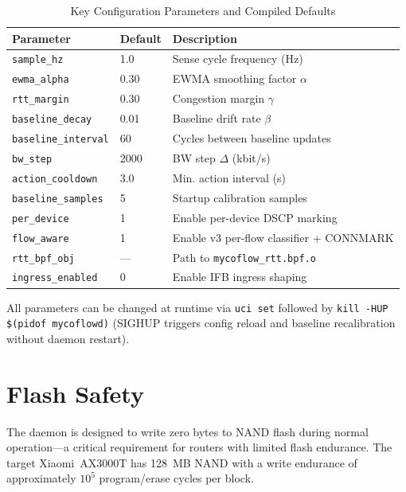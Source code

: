 \begin{table}[h]
\caption{Key Configuration Parameters and Compiled Defaults}
\label{tab:cfg}
\centering
\small
{\setlength{\tabcolsep}{4pt}
\begin{tabular}{p{4cm}p{1.2cm}p{7cm}}
\toprule
\textbf{Parameter} & \textbf{Default} & \textbf{Description} \\
\midrule
\texttt{sample\_hz}         & 1.0  & Sense cycle frequency (Hz) \\
\texttt{ewma\_alpha}        & 0.30 & EWMA smoothing factor $\alpha$ \\
\texttt{rtt\_margin}        & 0.30 & Congestion margin $\gamma$ \\
\texttt{baseline\_decay}    & 0.01 & Baseline drift rate $\beta$ \\
\texttt{baseline\_interval} & 60   & Cycles between baseline updates \\
\texttt{bw\_step}           & 2000 & BW step $\Delta$ (kbit/s) \\
\texttt{action\_cooldown}   & 3.0  & Min. action interval (s) \\
\texttt{baseline\_samples}  & 5    & Startup calibration samples \\
\texttt{per\_device}        & 1    & Enable per-device DSCP marking \\
\texttt{flow\_aware}        & 1    & Enable v3 per-flow classifier + CONNMARK \\
\texttt{rtt\_bpf\_obj}      & ---  & Path to \texttt{mycoflow\_rtt.bpf.o} \\
\texttt{ingress\_enabled}   & 0    & Enable IFB ingress shaping \\
\bottomrule
\end{tabular}}
\end{table}

All parameters can be changed at runtime via \texttt{uci set} followed by \texttt{kill -HUP \$(pidof mycoflowd)} (SIGHUP triggers config reload and baseline recalibration without daemon restart).

\section{Flash Safety}

The daemon is designed to write zero bytes to NAND flash during normal operation---a critical requirement for routers with limited flash endurance. The target Xiaomi~AX3000T has 128~MB NAND with a write endurance of approximately $10^5$ program/erase cycles per block.

